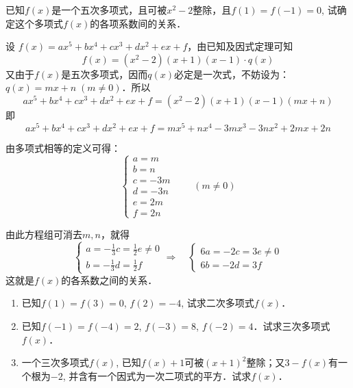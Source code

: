 \begin{example}
已知$f(x)$是一个五次多项式，且可被$x^2-2$整除，且$f(1)=f(-1)=0$, 试确定这个多项式$f(x)$的各项系数间的关系．
\end{example}

\begin{solution}
设 $f(x)=ax^5+bx^4+cx^3+dx^2+ex+f$，由已知及因式定理可知
\[f (x) = (x^2-2) (x+1)(x-1)\cdot q(x)\]
又由于$f(x)$是五次多项式，因而$q(x)$必定是一次式，不妨设为：$q(x)=mx+n\; (m\ne 0)$．所以
\[ax^5+bx^4+cx^3+dx^2+ex+f= (x^2-2) (x+1)(x-1)(mx+n)\] 
即
\[ax^5+bx^4+cx^3+dx^2+ex+f= mx^5+nx^4-3mx^3-3nx^2+2mx+2n\] 

由多项式相等的定义可得：
\[\begin{cases}
    a=m\\
    b=n\\
    c=-3m\\
    d=-3n\\
    e=2m\\
    f=2n
\end{cases}\qquad (m\ne 0)\]

由此方程组可消去$m,n$，就得
\[\begin{cases}
    a=-\frac{1}{3}c=\frac{1}{2}e\ne 0\\
    b=-\frac{1}{3}d=\frac{1}{2}f
\end{cases}\Rightarrow\quad \begin{cases}
    6a=-2c=3e\ne 0\\
    6b=-2d=3f
\end{cases}\]
这就是$f(x)$的各系数之间的关系．
\end{solution}

\begin{ex}
\begin{enumerate}
    \item 已知$f(1)=f(3)=0$, $f(2)=-4$, 试求二次多项式$f (x)$．
    \item 已知$f(-1)=f(-4)=2$, $f(-3)=8$, $f(-2)=4$．试求三次多项式$f(x)$．
    \item 一个三次多项式$f(x)$, 已知$f(x)+1$可被$(x+1)^2$整除；又$3-f(x)$有一个根为$-2$, 并含有一个因式为一次二项式的平方．试求$f(x)$．
\end{enumerate}
\end{ex}

